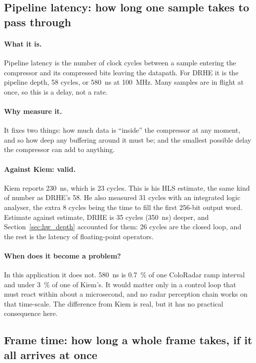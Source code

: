 \subsection{Pipeline latency: how long one sample takes to pass through}
\label{sec:hw_pipelat}

\paragraph{What it is.} Pipeline latency is the number of clock cycles between
a sample entering the compressor and its compressed bits leaving the datapath.
For DRHE it is the pipeline depth, \num{58} cycles, or \SI{580}{\nano\second}
at \SI{100}{\mega\hertz}. Many samples are in flight at once, so this is a
delay, not a rate.

\paragraph{Why measure it.} It fixes two things: how much data is ``inside''
the compressor at any moment, and so how deep any buffering around it must be;
and the smallest possible delay the compressor can add to anything.

\paragraph{Against Kiem: valid.} Kiem reports \SI{230}{\nano\second}, which is
23 cycles. This is his HLS estimate, the same kind of number as DRHE's 58. He
also measured 31 cycles with an integrated logic analyser, the extra 8 cycles
being the time to fill the first 256-bit output word. Estimate against
estimate, DRHE is 35 cycles (\SI{350}{\nano\second}) deeper, and
Section~\ref{sec:hw_depth} accounted for them: 26 cycles are the closed loop,
and the rest is the latency of floating-point operators.

\paragraph{When does it become a problem?} In this application it does not.
\SI{580}{\nano\second} is \SI{0.7}{\percent} of one ColoRadar ramp interval and
under \SI{3}{\percent} of one of Kiem's. It would matter only in a control loop
that must react within about a microsecond, and no radar perception chain works
on that time-scale. The difference from Kiem is real, but it has no practical
consequence here.

\subsection{Frame time: how long a whole frame takes, if it all arrives at once}
\label{sec:hw_frametime}

